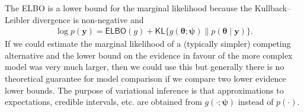 \documentclass[
  11pt,
  letterpaper,
]{scrbook}
\theoremstyle{definition}
\theoremstyle{plain}
\theoremstyle{plain}
\theoremstyle{plain}
\theoremstyle{definition}
\theoremstyle{definition}
\theoremstyle{remark}
\begin{document}
The ELBO is a lower bound for the marginal likelihood because the
Kullback--Leibler divergence is non-negative and \begin{align*}
\log p(\boldsymbol{y}) = \mathsf{ELBO}(g) +  \mathsf{KL}\{g(\boldsymbol{\theta};\boldsymbol{\psi}) \parallel p(\boldsymbol{\theta} \mid \boldsymbol{y})\}.
\end{align*} If we could estimate the marginal likelihood of a
(typically simpler) competing alternative and the lower bound on the
evidence in favour of the more complex model was very much larger, then
we could use this but generally there is no theoretical guarantee for
model comparison if we compare two lower evidence lower bounds. The
purpose of variational inference is that approximations to expectations,
credible intervals, etc. are obtained from
\(g(\cdot; \boldsymbol{\psi})\) instead of \(p(\cdot).\)
\end{document}
